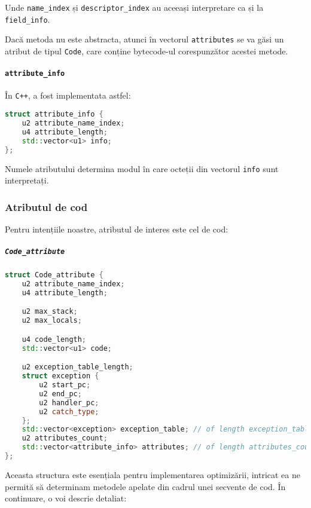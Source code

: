 Unde \texttt{name\_index} și \texttt{descriptor\_index} au aceeași
interpretare ca și la \texttt{field\_info}.

Dacă metoda nu este abstracta, atunci în vectorul \texttt{attributes} se
va găsi un atribut de tipul \texttt{Code}, care conține bytecode-ul
corespunzător acestei metode.

\paragraph{\texorpdfstring{\texttt{attribute\_info}}{attribute\_info}}\label{attribute_info}

În \texttt{C++}, a fost implementata astfel:

\begin{lstlisting}[language=C++]
struct attribute_info {
    u2 attribute_name_index;
    u4 attribute_length;
    std::vector<u1> info;
};
\end{lstlisting}

Numele atributului determina modul în care octeții din vectorul
\texttt{info} sunt interpretați.

\subsubsection{Atributul de cod}

Pentru intențiile noastre, atributul de interes este cel de cod:

\subparagraph{\texorpdfstring{\texttt{Code\_attribute}}{Code\_attribute}}\label{code_attribute}

\begin{lstlisting}[language=C++]
struct Code_attribute {
    u2 attribute_name_index;
    u4 attribute_length;

    u2 max_stack;
    u2 max_locals;

    u4 code_length;
    std::vector<u1> code;

    u2 exception_table_length;
    struct exception {
        u2 start_pc;
        u2 end_pc;
        u2 handler_pc;
        u2 catch_type;
    };
    std::vector<exception> exception_table; // of length exception_table_length.
    u2 attributes_count;
    std::vector<attribute_info> attributes; // of length attributes_count.
};
\end{lstlisting}

Aceasta structura este esențiala pentru implementarea optimizării,
intricat ea ne permită să determinam metodele apelate din cadrul unei secvente de cod.
În continuare, o voi descrie detaliat:

